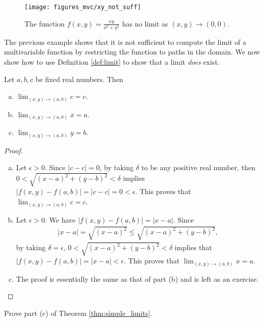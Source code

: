 \documentclass[12pt,letterpaper,reqno]{article}
\numberwithin{equation}{section}
\begin{document}
{\begin{figure}[h]
	\begin{center}
		\texttt{[image: figures\_mvc/xy\_not\_suff]}
	\end{center}
	\caption{The function $f(x,y)=\frac{xy}{x^2+y^2}$ has no limit as $(x,y) \to (0,0)$.}
\end{figure}
\newpage 
The previous example shows that it is not sufficient to compute the limit of a multivariable function by restricting the function to paths in the domain. We now show how to use Definition \ref{def:limit} to show that a limit \emph{does} exist.

\begin{thm}\label{thm:simple_limits}
Let $a,b,c$ be fixed real numbers. Then
\begin{enumerate}[(a)]
	\item $\lim_{(x,y) \to (a,b)} c=c$.
	\item $\lim_{(x,y) \to (a,b)} x = a$.
	\item $\lim_{(x,y) \to (a,b)} y = b$.
\end{enumerate}	
\end{thm}

\begin{proof}\hspace{15cm}
	\begin{enumerate}[(a)]
		\item Let $\epsilon>0$. Since $|c-c|=0$, by taking $\delta$ to be any positive real number, then \newline $0<\sqrt{(x-a)^2+(y-b)^2}<\delta$ implies $|f(x,y)-f(a,b)|=|c-c|=0<\epsilon$. This proves that $\lim_{(x,y) \to (a,b)} c=c$.
		\item Let $\epsilon>0$. We have $|f(x,y)-f(a,b)|=|x-a|$. Since 
		\begin{align*}
			|x-a|=\sqrt{(x-a)^2} \leq \sqrt{(x-a)^2+(y-b)^2},
		\end{align*}
		by taking $\delta=\epsilon$, $0<\sqrt{(x-a)^2+(y-b)^2}<\delta$ implies that $|f(x,y)-f(a,b)|=|x-a|<\epsilon$. This proves that $\lim_{(x,y) \to (a,b)} x = a$.
		\item The proof is essentially the same as that of part (b) and is left as an exercise.
	\end{enumerate}
\end{proof}

\begin{exercise}
Prove part (c) of Theorem \ref{thm:simple_limits}. 	
\end{exercise}

}
\end{document}
